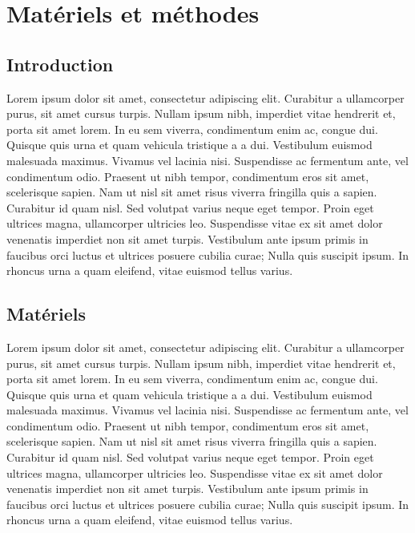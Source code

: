 \chapter{Matériels et méthodes }
\section{Introduction}

Lorem ipsum dolor sit amet, consectetur adipiscing elit. Curabitur a ullamcorper purus, sit amet cursus turpis. Nullam ipsum nibh, imperdiet vitae hendrerit et, porta sit amet lorem. In eu sem viverra, condimentum enim ac, congue dui. Quisque quis urna et quam vehicula tristique a a dui. Vestibulum euismod malesuada maximus. Vivamus vel lacinia nisi. Suspendisse ac fermentum ante, vel condimentum odio. Praesent ut nibh tempor, condimentum eros sit amet, scelerisque sapien. Nam ut nisl sit amet risus viverra fringilla quis a sapien. Curabitur id quam nisl. Sed volutpat varius neque eget tempor. Proin eget ultrices magna, ullamcorper ultricies leo. Suspendisse vitae ex sit amet dolor venenatis imperdiet non sit amet turpis. Vestibulum ante ipsum primis in faucibus orci luctus et ultrices posuere cubilia curae; Nulla quis suscipit ipsum. In rhoncus urna a quam eleifend, vitae euismod tellus varius.

\section{Matériels}
Lorem ipsum dolor sit amet, consectetur adipiscing elit. Curabitur a ullamcorper purus, sit amet cursus turpis. Nullam ipsum nibh, imperdiet vitae hendrerit et, porta sit amet lorem. In eu sem viverra, condimentum enim ac, congue dui. Quisque quis urna et quam vehicula tristique a a dui. Vestibulum euismod malesuada maximus. Vivamus vel lacinia nisi. Suspendisse ac fermentum ante, vel condimentum odio. Praesent ut nibh tempor, condimentum eros sit amet, scelerisque sapien. Nam ut nisl sit amet risus viverra fringilla quis a sapien. Curabitur id quam nisl. Sed volutpat varius neque eget tempor. Proin eget ultrices magna, ullamcorper ultricies leo. Suspendisse vitae ex sit amet dolor venenatis imperdiet non sit amet turpis. Vestibulum ante ipsum primis in faucibus orci luctus et ultrices posuere cubilia curae; Nulla quis suscipit ipsum. In rhoncus urna a quam eleifend, vitae euismod tellus varius.


